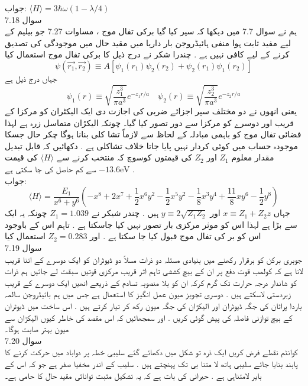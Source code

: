 جواب:
\(\langle H \rangle =3\hbar\omega(1-\lambda/4)\)\\
سوال 
7.18\\
ہم نے سوال 7.7 میں دیکھا کہ سپر کیا گیا برکی تفال موج ، مساوات 7.27 جو بیلیم کے لیے مفید ثابت ہوا منفی ہائیڈروجن بار داریا میں مقید حال میں موجودگی کی تصدیق کرنے کے لیے کافی نہیں ہے . چندرا شكر نے درج ذیل کا برکی تفال موج استعمال کیا
\[\psi(\vec{r_{1}},\vec{r_{2}})\equiv A[\psi_{1}(r_{1})\psi_{2}(r_{2})+\psi_{2}(r_{1})\psi_{1}(r_{2})]\]
جہاں درج ذیل ہے
\[\psi_{1}(r)\equiv \sqrt{\frac{z_{1}^{3}}{\pi a^{3}}}e^{-z_{1}r/a} \quad \psi_{2}(r)\equiv \sqrt{\frac{z_{2}^{3}}{\pi a^{3}}}e^{-z_{2}r/a}\] 
یعنی انھوں نے دو مختلف سپر اجزائے ضربی کی اجازت دی ایک الیکٹران کو مرکزا کے قریب اور دوسرے کو مرکزا سے دور تصور کیا گیا۔ چونکہ الیکڑان متماسل زرہ ہے لہذا فضائی تفال موج کو باہمی مبادلہ کے لحاظ سے لازماً تشا کلی بنانا ہوگا چکر حال جسکا موجودہ حساب میں کوئی کردار نہیں پایا جاتا خلاف تشاکلی ہے . دکھائیں کہ قابل تبدیل مقدار معلوم
\(Z_{1}\)
اور
\(Z_{2}\)
کی قیمتوں کوسوچ کہ منتخب کرنے سے
\(\langle H \rangle \) 
کی قیمت
\(-13.6\text{eV}\)
سے کم حاصل کی جا سکتی ہے .\\
جواب:
\[\langle H \rangle = \frac{E_{1}}{x^{6}+y^{6}}(-x^{8}+2x^{7}+\frac{1}{2}x^{6}y^{2}-\frac{1}{2}x^{5}y^{2}-\frac{1}{8}x^{3}y^{4}+\frac{11}{8}xy^{6}-\frac{1}{2}y^{8})\]
جہاں
\(x\equiv Z_{1}+Z_{2}z\)
اور
\(y\equiv2\sqrt{Z_{1}Z_{2}}\)
ہیں . چندر شیکر نے
\(Z_{1}=1.039\)
چونکہ یہ ایک سے بڑا ہے لہذا اس کو موثر مرکزی بار تصور نہیں کیا جاسکتا ہے . تاہم اس کے باوجود اس کو بر کی تفال موج قبول کیا جا سکتا ہے . اور
\(Z_{2}=0.283\)
استعمال کیا\\
سوال 
7.19\\
جوبری برکن کو برقرار رکھنے میں بنیادی مسئلہ دو ذرات مسلاً دو ڈیوٹران کو ایک دوسرے کے اتنا قریب لانا ہے کہ کولمب قوت دفع پر ان کے بیچ کششی تاہم اثر قریب مرکزی قوتیں سبقت لے جائیں ہم ذرات کو شاندار درجہ حرارت تک گرم کرکہ ان کو بلا منصوبہ تسادم کے ذریعے انھیں ایک دوسرے کے قریب زبردستی لاسکتے ہیں . دوسری تجویز میون عمل انگیز کا استعمال ہے جس میں ہم بائیڈروجن سالمہ باردا پراٹان کی جگہ ڈیوٹران اور الیکڑان کی جگہ میون رکھ کر تیار کرتے ہیں . اس ساخت میں ڈیوٹران کے بیچ توازنی فاصلہ کی پیش گوئی کریں . اور سمجھائیں کہ اس مقصد کی خاطر کیوں الیکڑان سے میون بہتر صابت ہوگا۔\\
سوال 
7.20\\
کوانٹم نقطے فرض کریں ایک ذرہ تو شکل  میں دکھائے گئے سلیبی خطہ پر دواباد میں حرکت کرنے کا پابند بنایا جائے سلیبی ہاتھ لا متنا بی تک پہنچتے ہیں . سلیب کے اندر مخفیا صفر ہے جو کہ اس کے بایر لامتناہی ہے . حیرانی کی بات ہے کہ یہ تشکیل مثبت توانائی مقید حال کا حامی ہے۔

